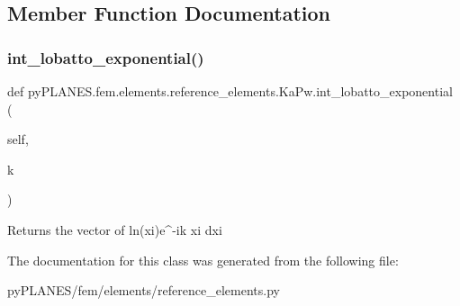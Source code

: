 \subsection{Member Function Documentation}
\mbox{\label{classpy_p_l_a_n_e_s_1_1fem_1_1elements_1_1reference__elements_1_1_ka_pw_ad87153ff42e7a432a2922bb67ac7b7be}} 
\subsubsection{\texorpdfstring{int\+\_\+lobatto\+\_\+exponential()}{int\_lobatto\_exponential()}}
{\footnotesize\ttfamily def py\+P\+L\+A\+N\+E\+S.\+fem.\+elements.\+reference\+\_\+elements.\+Ka\+Pw.\+int\+\_\+lobatto\+\_\+exponential (\begin{DoxyParamCaption}\item[{}]{self,  }\item[{}]{k }\end{DoxyParamCaption})}

\begin{DoxyVerb}Returns the vector of  ln(xi)e^{-ik xi} dxi\end{DoxyVerb}
 

The documentation for this class was generated from the following file\+:\begin{DoxyCompactItemize}
\item 
py\+P\+L\+A\+N\+E\+S/fem/elements/reference\+\_\+elements.\+py\end{DoxyCompactItemize}
